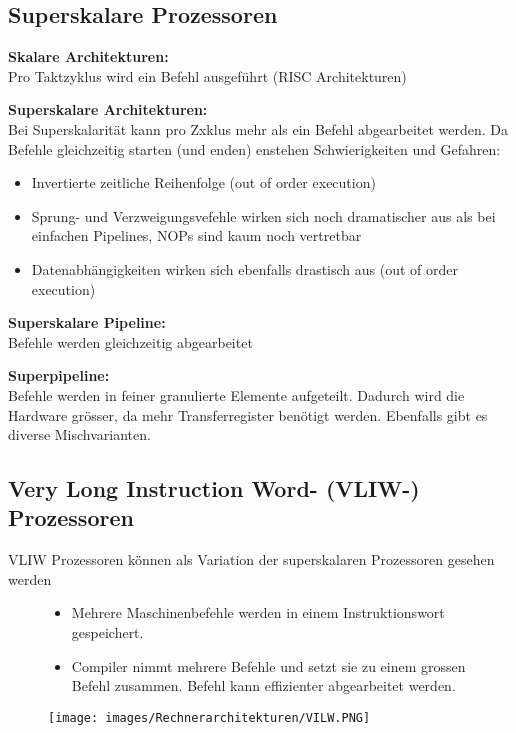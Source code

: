 \clearpage
\subsection{Superskalare Prozessoren}
\textbf{Skalare Architekturen:}\\
Pro Taktzyklus wird ein Befehl ausgeführt (RISC Architekturen)

\textbf{Superskalare Architekturen:}\\
Bei Superskalarität kann pro Zxklus mehr als ein Befehl abgearbeitet werden.
Da Befehle gleichzeitig starten (und enden) enstehen Schwierigkeiten und Gefahren:
\begin{itemize}[noitemsep,topsep=0pt]
	\item Invertierte zeitliche Reihenfolge (out of order execution)
	\item Sprung- und Verzweigungsvefehle wirken sich noch dramatischer aus als bei einfachen Pipelines, NOPs sind kaum noch vertretbar
	\item Datenabhängigkeiten wirken sich ebenfalls drastisch aus (out of order execution)
			
\end{itemize}

\textbf{Superskalare Pipeline:}\\
Befehle werden gleichzeitig abgearbeitet

\textbf{Superpipeline:}\\
Befehle werden in feiner granulierte Elemente aufgeteilt. Dadurch wird die Hardware grösser, da mehr Transferregister benötigt werden.\newline
Ebenfalls gibt es diverse Mischvarianten.
\vspace{-0.5cm}
\subsection{Very Long Instruction Word- (VLIW-) Prozessoren}
VLIW Prozessoren können als Variation der superskalaren Prozessoren gesehen werden

\begin{figure}[htbp]
	
	\begin{minipage}{0.55\textwidth}
		\begin{itemize}[noitemsep,topsep=0pt]
			\item Mehrere Maschinenbefehle werden in einem Instruktionswort gespeichert.
			\item Compiler nimmt mehrere Befehle und setzt sie zu einem grossen Befehl zusammen. Befehl kann effizienter abgearbeitet werden.
			
		\end{itemize}
		
	\end{minipage}
	\hfill		
	\begin{minipage}{0.4\textwidth} 
		\texttt{[image: images/Rechnerarchitekturen/VILW.PNG]}
	\end{minipage}
	
\end{figure}
\vspace{-1cm}
